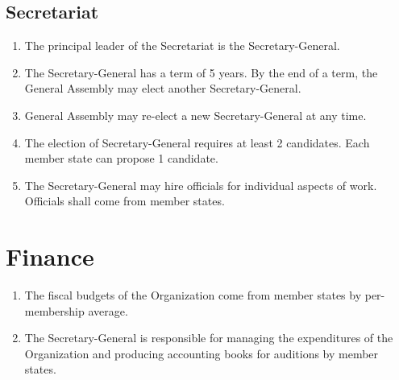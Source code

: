 \documentclass[11pt,a4paper]{article}
\begin{document}
\subsection{Secretariat}
\begin{enumerate}
	\item The principal leader of the Secretariat is the Secretary-General.
	\item The Secretary-General has a term of 5 years. By the end of a term, the General Assembly may elect another Secretary-General.
	\item General Assembly may re-elect a new Secretary-General at any time.
	\item The election of Secretary-General requires at least 2 candidates. Each member state can propose 1 candidate.
	\item The Secretary-General may hire officials for individual aspects of work. Officials shall come from member states.
\end{enumerate}



\section{Finance}
\begin{enumerate}
	\item The fiscal budgets of the Organization come from member states by per-membership average.
	\item The Secretary-General is responsible for managing the expenditures of the Organization and
	      producing accounting books for auditions by member states.
\end{enumerate}
\end{document}

